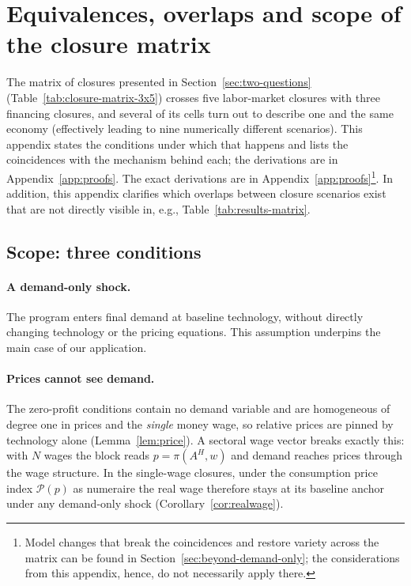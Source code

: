\section{Equivalences, overlaps and scope of the closure matrix}\label{app:equivalences}

\noindent
The matrix of closures presented in Section~\ref{sec:two-questions} (Table~\ref{tab:closure-matrix-3x5}) crosses five
labor-market closures with three financing closures, and several of its
cells turn out to describe one and the same economy (effectively leading to nine numerically different scenarios). This appendix states the conditions under which that happens and lists the coincidences with the mechanism behind each; the derivations are in Appendix~\ref{app:proofs}. The
exact derivations are in Appendix~\ref{app:proofs}\footnote{Model changes that
break the coincidences and restore variety across the matrix can be found in
Section~\ref{sec:beyond-demand-only}; the considerations from this appendix,
hence, do not necessarily apply there.}. In addition, this appendix clarifies
which overlaps between closure scenarios exist that are not directly visible
in, e.g., Table~\ref{tab:results-matrix}.

\subsection*{Scope: three conditions}

\paragraph{A demand-only shock.} 
The program enters final demand at baseline technology, without directly changing technology or the pricing equations. This assumption underpins the main case of our application.

\paragraph{Prices cannot see demand.} 
The zero-profit conditions contain no demand variable and are homogeneous of degree one in prices and the \emph{single} money wage, so relative prices are pinned by technology alone (Lemma~\ref{lem:price}). A sectoral wage vector breaks exactly this: with $N$ wages the block reads $p=\pi(A^{H},w)$ and demand reaches prices through the wage structure. In the single-wage closures, under the consumption price index $\mathcal{P}(p)$ as numeraire the real wage therefore stays at its baseline anchor under any demand-only shock (Corollary~\ref{cor:realwage}).

